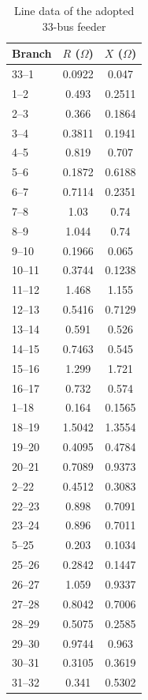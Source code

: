 \documentclass[journal]{IEEEtran}
\begin{document}
\begin{table}[H]
\centering
\caption{Line data of the adopted 33-bus feeder}
\label{tab:appendix_line_data}
\setlength{\tabcolsep}{3pt}
\renewcommand{\arraystretch}{1.0}
\begin{tabular}{@{}lcc@{}}
\toprule
Branch & $R$ ($\Omega$) & $X$ ($\Omega$) \\
\midrule
33--1 & 0.0922 & 0.047 \\
1--2 & 0.493 & 0.2511 \\
2--3 & 0.366 & 0.1864 \\
3--4 & 0.3811 & 0.1941 \\
4--5 & 0.819 & 0.707 \\
5--6 & 0.1872 & 0.6188 \\
6--7 & 0.7114 & 0.2351 \\
7--8 & 1.03 & 0.74 \\
8--9 & 1.044 & 0.74 \\
9--10 & 0.1966 & 0.065 \\
10--11 & 0.3744 & 0.1238 \\
11--12 & 1.468 & 1.155 \\
12--13 & 0.5416 & 0.7129 \\
13--14 & 0.591 & 0.526 \\
14--15 & 0.7463 & 0.545 \\
15--16 & 1.299 & 1.721 \\
16--17 & 0.732 & 0.574 \\
1--18 & 0.164 & 0.1565 \\
18--19 & 1.5042 & 1.3554 \\
19--20 & 0.4095 & 0.4784 \\
20--21 & 0.7089 & 0.9373 \\
2--22 & 0.4512 & 0.3083 \\
22--23 & 0.898 & 0.7091 \\
23--24 & 0.896 & 0.7011 \\
5--25 & 0.203 & 0.1034 \\
25--26 & 0.2842 & 0.1447 \\
26--27 & 1.059 & 0.9337 \\
27--28 & 0.8042 & 0.7006 \\
28--29 & 0.5075 & 0.2585 \\
29--30 & 0.9744 & 0.963 \\
30--31 & 0.3105 & 0.3619 \\
31--32 & 0.341 & 0.5302 \\
\bottomrule
\end{tabular}
\end{table}
\end{document}
